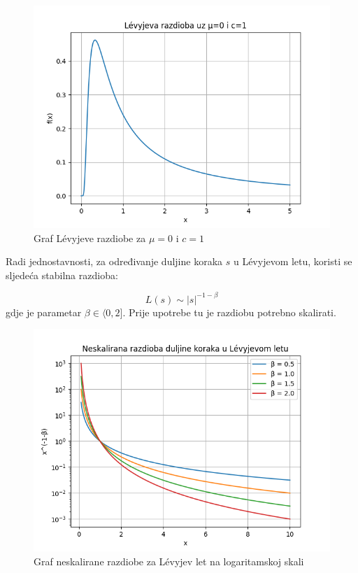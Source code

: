\begin{figure}[H]
	\centering
	\includegraphics[width=14cm]{levy_dist.png}
	\caption{Graf L\'evyjeve razdiobe za $\mu = 0$ i $c = 1$} 
\end{figure}

Radi jednostavnosti, za određivanje duljine koraka $s$ u L\'evyjevom letu, koristi se sljedeća stabilna razdioba:

\begin{equation}
    L(s) \sim |s|^{-1 - \beta}
\end{equation}
gdje je parametar $\beta \in \langle0, 2]$. Prije upotrebe tu je razdiobu potrebno skalirati.

\begin{figure}[H]
	\centering
	\includegraphics[width=14cm]{levy_step.png}
	\caption{Graf neskalirane razdiobe za L\'evyjev let na logaritamskoj skali} 
\end{figure}


